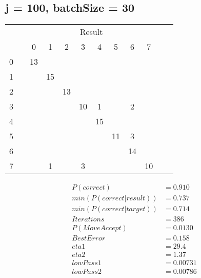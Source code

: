 \documentclass[10pt, conference, compsocconf]{IEEEtran}
\begin{document}
\subsection{j = 100, batchSize = 30}
\begin{center}
\begin{tabular}{l*{10}{c}r}
& & & & & \multicolumn{2}{c}{Result}  & & \\
 &\vline& 0 & 1 & 2 & 3 & 4 & 5 & 6 & 7 \\
\hline
0 &\vline&   13&    &    &    &    &    &    &   \\
 1 &\vline&     &  15&    &    &    &    &    &   \\
 2 &\vline&     &    &  13&    &    &    &    &   \\
 3 &\vline&     &    &    &  10&   1&    &   2&   \\
 4 &\vline&     &    &    &    &  15&    &    &   \\
 5 &\vline&     &    &    &    &    &  11&   3&   \\
 6 &\vline&     &    &    &    &    &    &  14&   \\
 7 &\vline&     &   1&    &   3&    &    &    &  10\\
\end{tabular}
\begin{align}
P( correct )  &=   0.910\\
min( P( correct |  result  ) )  &=   0.737\\
min( P( correct | target ) )  &=   0.714\\
Iterations &=   386\\
P(Move Accept) &=   0.0130\\
Best Error &=  0.158\\
eta1     &=   29.4\\
eta2   &=     1.37\\
lowPass1 &=   0.00731\\
lowPass2 &=   0.00786
\end{align}
\end{center}
\end{document}
